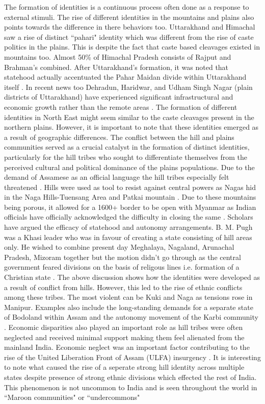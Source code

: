 The formation of identities is a continuous process often done as a response to external stimuli. The rise of different identities in the mountains and plains also points towards the difference in there behaviors too. Uttarakhand and Himachal saw a rise of distinct ``pahari" identity \citep{mishra2000politics} which was different from the rise of caste politics in the plains. This is despite the fact that caste based cleavages existed in mountains too. Almost 50\% of Himachal Pradesh consists of Rajput and Brahman's combined. After Uttarakhand's formation, it was noted that statehood actually accentuated the Pahar Maidan divide within Uttarakhand itself \citep{mathur2015remote}. In recent news too Dehradun, Haridwar, and Udham Singh Nagar (plain districts of Uttarakhand) have experienced significant infrastructural and economic growth rather than the remote areas \citep{Mohammad_TOI}. The formation of different identities in North East might seem similar to the caste cleavages present in the northern plains. However, it is important to note that these identities emerged as a result of geographic differences. The conflict between the hill and plains communities served as a crucial catalyst in the formation of distinct identities, particularly for the hill tribes who sought to differentiate themselves from the perceived cultural and political dominance of the plains populations. Due to the demand of Assamese as an official language the hill tribes especially felt threatened \citep{inoue2005integration}. Hills were used as tool to resist against central powers as Nagas hid in the Naga Hills-Tuensang Area and Patkai mountain \citep{kapai2020spatial}. Due to these mountains being porous, it allowed for a 1600+ border to be open with Myanmar as Indian officials have officially acknowledged the difficulty in closing the same \citep{Bureau_2024}. Scholars have argued the efficacy of statehood and autonomy arrangements.  B. M. Pugh was a Khasi leader who was in favour of creating a state consisting of hill areas only. He wished to combine present day Meghalaya, Nagaland, Arunachal Pradesh, Mizoram together but the motion didn't go through as the central government feared divisions on the basis of religous lines i.e. formation of a Christian state \citep{karlsson2013evading}. The above discussion shows how the identities were developed as a result of conflict from hills. However, this led to the rise of ethnic conflicts among these tribes. The most violent can be Kuki and Naga as tensions rose in Manipur.  Examples also include the long-standing demands for a separate state of Bodoland within Assam  and the autonomy movement of the Karbi community \citep{sarma2017bodoland}. Economic disparities also played an important role as hill tribes were often neglected and received minimal support making them feel alienated from the mainland India. Economic neglect was an important factor contributing to the rise of the United Liberation Front of Assam (ULFA) insurgency \citep{chima2023insurgency}. It is interesting to note what caused the rise of a seperate strong hill identity across multiple states despite presence of strong ethnic divisions which effected the rest of India. This phenomenon is not uncommon to India and is seen throughout the world in ``Maroon communities"  or ``undercommons" 